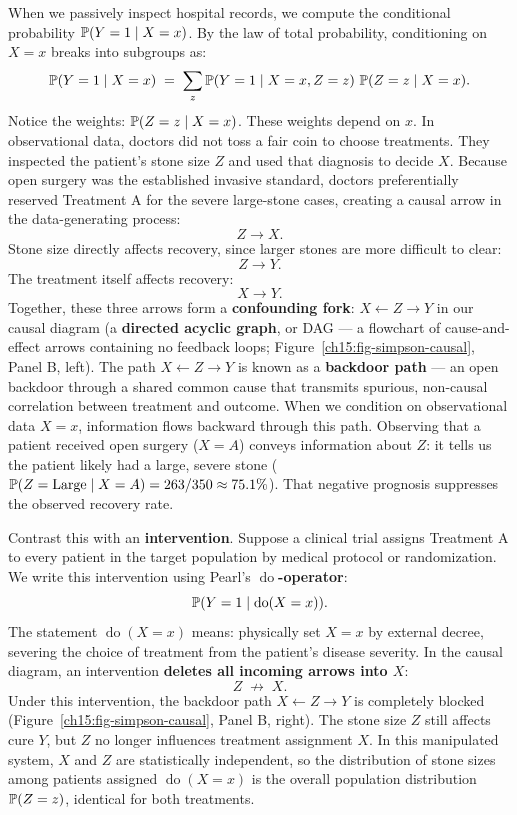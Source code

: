 When we passively inspect hospital records, we compute the conditional probability $\P(Y = 1 \given X = x)$. By the law of total probability, conditioning on $X = x$ breaks into subgroups as:
\begin{equation}
\label{ch15:eq-observational-cond}
  \P(Y = 1 \given X = x)
  \;=\; \sum_{z} \P(Y = 1 \given X = x, Z = z)\,\P(Z = z \given X = x).
\end{equation}
Notice the weights: $\P(Z = z \given X = x)$. These weights depend on $x$.
In observational data, doctors did not toss a fair coin to choose treatments. They inspected the patient's stone size $Z$ and used that diagnosis to decide $X$. Because open surgery was the established invasive standard, doctors preferentially reserved Treatment A for the severe large-stone cases, creating a causal arrow in the data-generating process:
\[
  Z \longrightarrow X.
\]
Stone size directly affects recovery, since larger stones are more difficult to clear:
\[
  Z \longrightarrow Y.
\]
The treatment itself affects recovery:
\[
  X \longrightarrow Y.
\]
Together, these three arrows form a \textbf{confounding fork}: $X \longleftarrow Z \longrightarrow Y$ in our causal diagram (a \textbf{directed acyclic graph}, or DAG --- a flowchart of cause-and-effect arrows containing no feedback loops; Figure~\ref{ch15:fig-simpson-causal}, Panel B, left).
The path $X \leftarrow Z \to Y$ is known as a \textbf{backdoor path} --- an open backdoor through a shared common cause that transmits spurious, non-causal correlation between treatment and outcome. When we condition on observational data $X = x$, information flows backward through this path. Observing that a patient received open surgery ($X = A$) conveys information about $Z$: it tells us the patient likely had a large, severe stone ($\P(Z = \text{Large} \given X = A) = 263/350 \approx 75.1\%$). That negative prognosis suppresses the observed recovery rate.

Contrast this with an \textbf{intervention}. Suppose a clinical trial assigns Treatment A to every patient in the target population by medical protocol or randomization. We write this intervention using Pearl's \textbf{$\operatorname{do}$-operator}:
\[
  \P(Y = 1 \given \operatorname{do}(X = x)).
\]
The statement $\operatorname{do}(X = x)$ means: physically set $X = x$ by external decree, severing the choice of treatment from the patient's disease severity. In the causal diagram, an intervention \textbf{deletes all incoming arrows into $X$}:
\[
  Z \;\not\longrightarrow\; X.
\]
Under this intervention, the backdoor path $X \leftarrow Z \to Y$ is completely blocked (Figure~\ref{ch15:fig-simpson-causal}, Panel B, right). The stone size $Z$ still affects cure $Y$, but $Z$ no longer influences treatment assignment $X$. In this manipulated system, $X$ and $Z$ are statistically independent, so the distribution of stone sizes among patients assigned $\operatorname{do}(X = x)$ is the overall population distribution $\P(Z = z)$, identical for both treatments.

